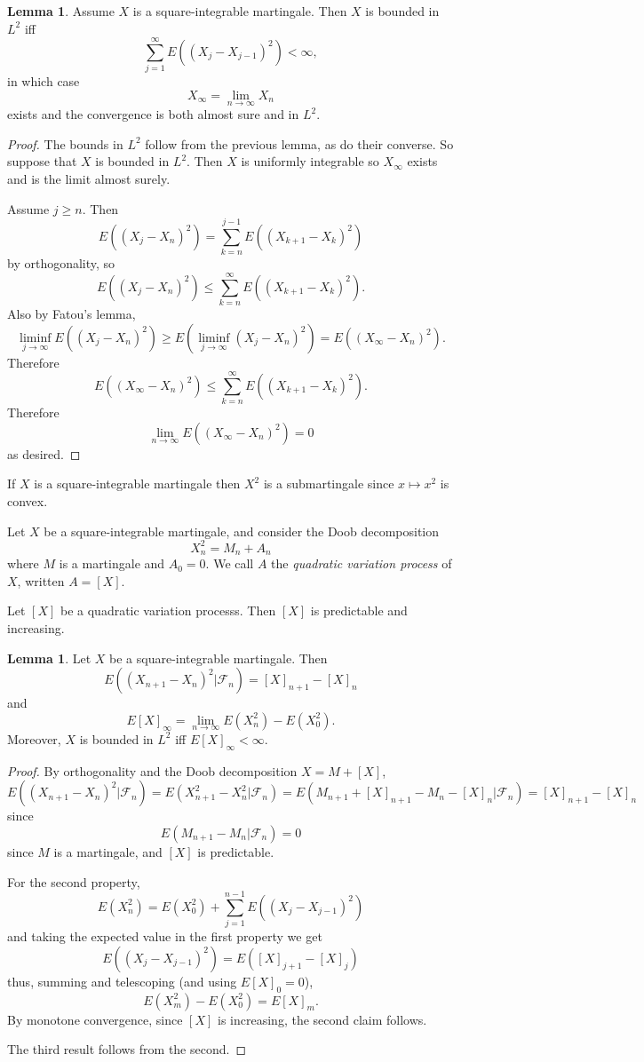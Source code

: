 \documentclass[12pt]{book}
\newcommand{\dfn}[1]{\emph{#1}\index{#1}}
\theoremstyle{definition}
\newtheorem{lemma}[theorem]{Lemma}
\newenvironment{definition}
  {\pushQED{\qed}\renewcommand{\qedsymbol}{$\diamondsuit$}\definitionx}
  {\popQED\endexamplex}
\begin{document}
\begin{lemma}
Assume $X$ is a square-integrable martingale.
Then $X$ is bounded in $L^2$ iff
$$\sum_{j=1}^\infty E((X_j - X_{j-1})^2) < \infty,$$
in which case
$$X_\infty = \lim_{n \to \infty} X_n$$
exists and the convergence is both almost sure and in $L^2$.
\end{lemma}
\begin{proof}
The bounds in $L^2$ follow from the previous lemma, as do their converse.
So suppose that $X$ is bounded in $L^2$.
Then $X$ is uniformly integrable so $X_\infty$ exists and is the limit almost surely.

Assume $j \geq n$. Then
$$E((X_j - X_n)^2) = \sum_{k=n}^{j-1} E((X_{k+1} - X_k)^2)$$
by orthogonality, so
$$E((X_j - X_n)^2) \leq \sum_{k=n}^\infty E((X_{k+1} - X_k)^2).$$
Also by Fatou's lemma,
$$\liminf_{j \to \infty} E((X_j - X_n)^2) \geq E\left(\liminf_{j \to \infty} (X_j - X_n)^2\right) = E((X_\infty - X_n)^2).$$
Therefore
$$E((X_\infty - X_n)^2) \leq \sum_{k=n}^\infty E((X_{k+1} - X_k)^2).$$
Therefore
$$\lim_{n \to \infty} E((X_\infty - X_n)^2) = 0$$
as desired.
\end{proof}

If $X$ is a square-integrable martingale then $X^2$ is a submartingale since $x \mapsto x^2$ is convex.

\begin{definition}
Let $X$ be a square-integrable martingale, and consider the Doob decomposition
$$X_n^2 = M_n + A_n$$
where $M$ is a martingale and $A_0 = 0$.
We call $A$ the \dfn{quadratic variation process} of $X$, written $A = [X]$.
\end{definition}

Let $[X]$ be a quadratic variation processs. Then $[X]$ is predictable and increasing.

\begin{lemma}
Let $X$ be a square-integrable martingale.
Then
$$E((X_{n+1} - X_n)^2|\mathcal F_n) = [X]_{n+1} - [X]_n$$
and
$$E[X]_\infty = \lim_{n \to \infty} E(X_n^2) - E(X_0^2).$$
Moreover, $X$ is bounded in $L^2$ iff $E[X]_\infty < \infty$.
\end{lemma}
\begin{proof}
By orthogonality and the Doob decomposition $X = M + [X]$,
$$E((X_{n+1} - X_n)^2|\mathcal F_n) = E(X_{n+1}^2 - X_n^2|\mathcal F_n) = E(M_{n+1} + [X]_{n+1} - M_n - [X]_n|\mathcal F_n) = [X]_{n+1} - [X]_n$$
since
$$E(M_{n+1} - M_n|\mathcal F_n) = 0$$
since $M$ is a martingale, and $[X]$ is predictable.

For the second property,
$$E(X_n^2) = E(X_0^2) + \sum_{j=1}^{n-1} E((X_j - X_{j-1})^2)$$
and taking the expected value in the first property we get
$$E((X_j - X_{j-1})^2) = E([X]_{j+1} - [X]_j)$$
thus, summing and telescoping (and using $E[X]_0 = 0$),
$$E(X_m^2) - E(X_0^2) = E[X]_m.$$
By monotone convergence, since $[X]$ is increasing, the second claim follows.

The third result follows from the second.
\end{proof}
\end{document}
